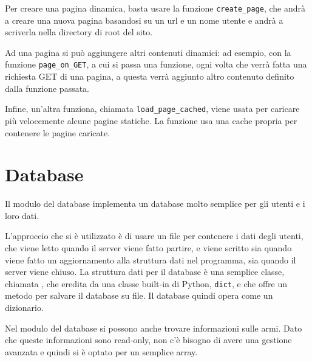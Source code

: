 \documentclass[a4paper,12pt]{report}
\begin{document}
Per creare una pagina dinamica, basta usare la funzione \texttt{create\_page}, che andrà a creare una nuova pagina basandosi su un url e un nome utente e andrà a scriverla nella directory di root del sito.

Ad una pagina si può aggiungere altri contenuti dinamici: ad esempio, con la funzione \texttt{page\_on\_GET}, a cui si passa una funzione, ogni volta che verrà fatta una richiesta GET di una pagina, a questa verrà aggiunto altro contenuto definito dalla funzione passata.

Infine, un'altra funziona, chiamata \texttt{load\_page\_cached}, viene usata per caricare più velocemente alcune pagine statiche. La funzione usa una cache propria per contenere le pagine caricate.

\section{Database}

Il modulo del database implementa un database molto semplice per gli utenti e i loro dati.

L'approccio che si è utilizzato è di usare un file per contenere i dati degli utenti, che viene letto quando il server viene fatto partire, e viene scritto sia quando viene fatto un aggiornamento alla struttura dati nel programma, sia quando il server viene chiuso. La struttura dati per il database è una semplice classe, chiamata , che eredita da una classe built-in di Python, \texttt{dict}, e che offre un metodo per salvare il database su file. Il database quindi opera come un dizionario.

Nel modulo del database si possono anche trovare informazioni sulle armi. Dato che queste informazioni sono read-only, non c'è bisogno di avere una gestione avanzata e quindi si è optato per un semplice array.
\end{document}
